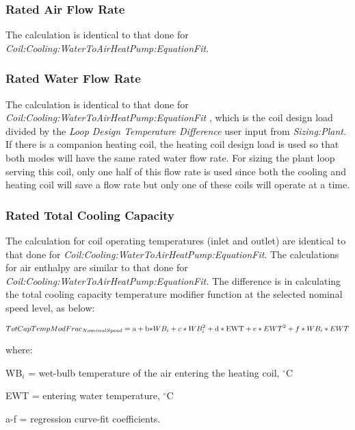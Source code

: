 \subsubsection{Rated Air Flow Rate}\label{rated-air-flow-rate-1}

The calculation is identical to that done for \emph{Coil:Cooling:WaterToAirHeatPump:EquationFit}.

\subsubsection{Rated Water Flow Rate}\label{rated-water-flow-rate-1}

The calculation is identical to that done for \emph{Coil:Cooling:WaterToAirHeatPump:EquationFit} , which is the coil design load divided by the \emph{Loop Design Temperature Difference} user input from \emph{Sizing:Plant.} If there is a companion heating coil, the heating coil design load is used so that both modes will have the same rated water flow rate. For sizing the plant loop serving this coil, only one half of this flow rate is used since both the cooling and heating coil will save a flow rate but only one of these coils will operate at a time.

\subsubsection{Rated Total Cooling Capacity}\label{rated-total-cooling-capacity-1}

The calculation for coil operating temperatures (inlet and outlet) are identical to that done for \emph{Coil:Cooling:WaterToAirHeatPump:EquationFit}. The calculations for air enthalpy are similar to that done for \emph{Coil:Cooling:WaterToAirHeatPump:EquationFit.} The difference is in calculating the total cooling capacity temperature modifier function at the selected nominal speed level, as below:

\begin{equation}
TotCapTempModFra{c_{NominalSpeed}} = {\rm{a}} + {\rm{b*}}W{B_i} + c*WB_i^2 + {\rm{d*EWT}} + e*EW{T^2} + f*W{B_i}*EWT
\end{equation}

where:

WB\(_{i}\) = wet-bulb temperature of the air entering the heating coil, \(^{\circ}\)C

EWT = entering water temperature, \(^{\circ}\)C

a-f = regression curve-fit coefficients.


